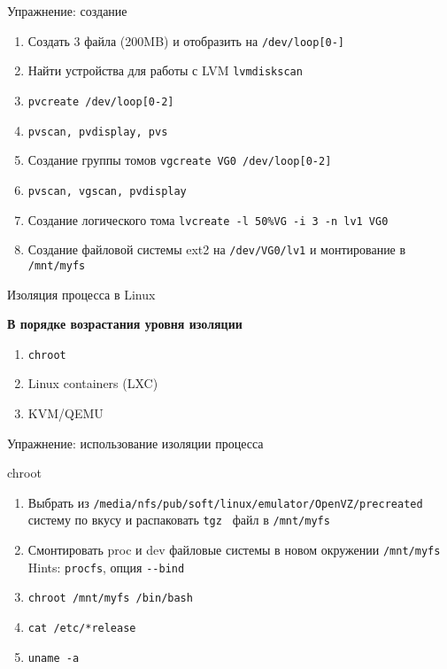 \documentclass[ignorenonframetext, professionalfonts, hyperref={pdftex, unicode}]{beamer}
\begin{document}
\begin{frame}{Упражнение: создание}
  \begin{enumerate}
    \item Создать 3 файла (200MB) и отобразить на {\tt /dev/loop[0-]}
	\item Найти устройства для работы с LVM {\tt lvmdiskscan}
	\item  {\tt pvcreate /dev/loop[0-2]}
    \item  {\tt pvscan, pvdisplay, pvs}
		\pause
    \item Создание группы томов {\tt vgcreate VG0 /dev/loop[0-2]}
    \item {\tt pvscan, vgscan, pvdisplay}
		\pause
    \item Создание логического тома {\tt lvcreate  -l 50\%VG -i 3 -n lv1 VG0}
	\item Создание файловой системы ext2 на {\tt /dev/VG0/lv1} и монтирование в {\tt /mnt/myfs}
	\end{enumerate}
\end{frame}

\begin{frame}{Изоляция процесса в Linux}
  \begin{center}
    \textbf{В порядке возрастания уровня изоляции}
  \end{center}
  \begin{enumerate}
    \item {\tt chroot}
    \item Linux containers (LXC)
    \item KVM/QEMU
  \end{enumerate}
\end{frame}

\begin{frame}{Упражнение: использование изоляции процесса}
  \begin{block}{chroot}
    \begin{enumerate}
      \item Выбрать из {\tt /media/nfs/pub/soft/linux/emulator/OpenVZ/precreated} систему по вкусу и распаковать {\tt tgz } файл в {\tt /mnt/myfs}
      \item Смонтировать proc и dev файловые системы в новом окружении {\tt /mnt/myfs} \\
		  Hints: {\tt procfs}, опция {\tt -\phantom{}-bind}
      \item {\tt chroot /mnt/myfs /bin/bash}
	  \item {\tt cat /etc/*release}
	  \item {\tt uname -a}
    \end{enumerate}
  \end{block}
\end{frame}
\end{document}
